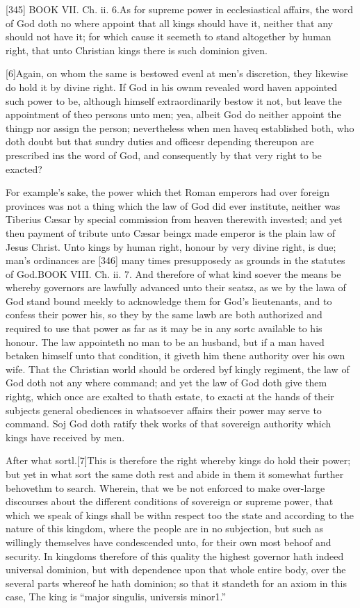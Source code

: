 [345]
BOOK VII. Ch. ii. 6.As for supreme power in ecclesiastical affairs, the word of God doth no where appoint that all kings should have it, neither that any should not have it; for which cause it seemeth to stand altogether by human right, that unto Christian kings there is such dominion given.

[6]Again, on whom the same is bestowed evenl at men’s discretion, they likewise do hold it by divine right. If God in his ownm revealed word haven appointed such power to be, although himself extraordinarily bestow it not, but leave the appointment of theo persons unto men; yea, albeit God do neither appoint the thingp nor assign the person; nevertheless when men haveq established both, who doth doubt but that sundry duties and officesr depending thereupon are prescribed ins the word of God, and consequently by that very right to be exacted?

For example’s sake, the power which thet Roman emperors had over foreign provinces was not a thing which the law of God did ever institute, neither was Tiberius Cæsar by special commission from heaven therewith invested; and yet theu payment of tribute unto Cæsar beingx made emperor is the plain law of Jesus Christ. Unto kings by human right, honour by very divine right, is due; man’s ordinances are [346] many times presupposedy as grounds in the statutes of God.BOOK VIII. Ch. ii. 7. And therefore of what kind soever the means be whereby governors are lawfully advanced unto their seatsz, as we by the lawa of God stand bound meekly to acknowledge them for God’s lieutenants, and to confess their power his, so they by the same lawb are both authorized and required to use that power as far as it may be in any sortc available to his honour. The law appointeth no man to be an husband, but if a man haved betaken himself unto that condition, it giveth him thene authority over his own wife. That the Christian world should be ordered byf kingly regiment, the law of God doth not any where command; and yet the law of God doth give them rightg, which once are exalted to thath estate, to exacti at the hands of their subjects general obediences in whatsoever affairs their power may serve to command. Soj God doth ratify thek works of that sovereign authority which kings have received by men.

After what sortl.[7]This is therefore the right whereby kings do hold their power; but yet in what sort the same doth rest and abide in them it somewhat further behovethm to search. Wherein, that we be not enforced to make over-large discourses about the different conditions of sovereign or supreme power, that which we speak of kings shall be withn respect too the state and according to the nature of this kingdom, where the people are in no subjection, but such as willingly themselves have condescended unto, for their own most behoof and security. In kingdoms therefore of this quality the highest governor hath indeed universal dominion, but with dependence upon that whole entire body, over the several parts whereof he hath dominion; so that it standeth for an axiom in this case, The king is “major singulis, universis minor1.”

